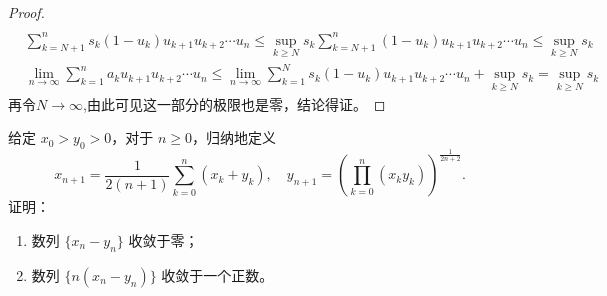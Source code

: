 \documentclass[../../main.tex]{subfiles}%
\begin{document}
\begin{proof}
\begin{align*}
\end{align*}
\begin{align*}
&\sum_{k = N + 1}^{n}s_k(1 - u_k)u_{k + 1}u_{k + 2}\cdots u_n\leqslant \sup_{k\geqslant  N}s_k\sum_{k = N + 1}^{n}(1 - u_k)u_{k + 1}u_{k + 2}\cdots u_n\leqslant \sup_{k\geqslant  N}s_k\\
&\lim_{n\rightarrow\infty}\sum_{k = 1}^{n}a_ku_{k + 1}u_{k + 2}\cdots u_n\leqslant \lim_{n\rightarrow\infty}\sum_{k = 1}^{N}s_k(1 - u_k)u_{k + 1}u_{k + 2}\cdots u_n+\sup_{k\geqslant  N}s_k=\sup_{k\geqslant  N}s_k
\end{align*}
再令$N\to \infty$,由此可见这一部分的极限也是零，结论得证。
\end{proof}

\begin{example}
给定 $x_0 > y_0 > 0$，对于 $n \geqslant 0$，归纳地定义
\[
x_{n+1} = \frac{1}{2(n+1)}\sum_{k=0}^{n}(x_k + y_k),\quad y_{n+1} = \left( \prod_{k=0}^{n}(x_k y_k) \right)^{\frac{1}{2n+2}}.
\]
证明：
\begin{enumerate}[(1)]
\item 数列 $\{x_n - y_n\}$ 收敛于零；

\item 数列 $\{n(x_n - y_n)\}$ 收敛于一个正数。
\end{enumerate}
\end{example}
\end{document}
